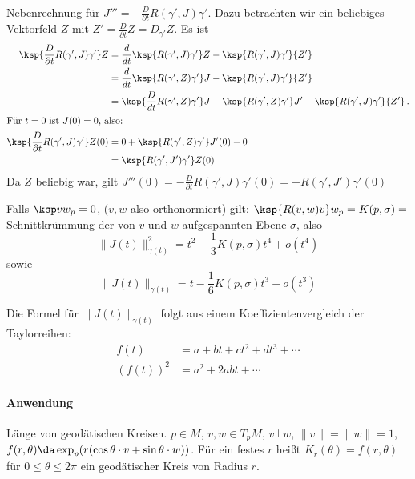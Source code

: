 \documentclass[a4paper,twoside,DIV15,BCOR12mm]{scrbook}
\begin{document}
\begin{beispiel}
\begin{beweis}
\begin{enumerate}
Nebenrechnung für $J'''= -\frac D {\partial t} R(\gamma',J)\gamma'$. Dazu betrachten wir ein beliebiges Vektorfeld $Z$ mit $Z' = \frac D{\partial t}Z = D_{\gamma'}Z$. Es ist 
\begin{align*}
\ksp{\frac D{\partial t} R(\gamma',J) \gamma'}Z &= \frac d{dt} \ksp {R(\gamma',J)\gamma'}Z - \ksp{R(\gamma',J)\gamma'}{Z'}\\
&= \frac d{dt} \ksp {R(\gamma',Z)\gamma'}J - \ksp{R(\gamma',J)\gamma'}{Z'}\\
&= \ksp {\frac D{dt} R(\gamma',Z)\gamma'}J + \ksp {R(\gamma',Z)\gamma'} J' - \ksp{R(\gamma',J)\gamma'}{Z'}\,.\\
\intertext{Für $t=0$ ist $J(0)=0$, also:}
\ksp{\frac D{\partial t} R(\gamma',J) \gamma'}Z(0) &= 0 + \ksp {R(\gamma',Z)\gamma'} J'(0) - 0 \\
&= \ksp{R(\gamma',J')\gamma'}Z(0)
\end{align*}
Da $Z$ beliebig war, gilt $J'''(0) = - \frac D{\partial t} R(\gamma',J) \gamma'(0) = - R(\gamma',J')\gamma'(0)$

\end{enumerate}
\end{beweis}

\begin{korrolar}
Falls $\ksp v w_p =0$, ($v,w$ also orthonormiert) gilt: $\ksp {R(v,w)v}w_p = K(p,\sigma) =$ Schnittkrümmung der von $v$ und $w$ aufgespannten Ebene $\sigma$, also
\[
\|J(t)\|_{\gamma(t)}^2 =t^2 - \frac 1 3 K(p,\sigma)t^4 + o(t^4)
\]
sowie
\[
\|J(t)\|_{\gamma(t)} = t - \frac 1 6 K(p,\sigma)t^3 + o(t^3)
\]

\end{korrolar}

\begin{beweis}
Die Formel für $\|J(t)\|_{\gamma(t)}$ folgt aus einem Koeffizientenvergleich der Taylorreihen:
\begin{align*}
f(t) &= a + bt + ct^2 + dt^3+\cdots \\
(f(t))^2 &= a^2 + 2abt + \cdots
\end{align*}
\end{beweis}

\paragraph{Anwendung} Länge von geodätischen Kreisen. $p\in M$, $v,w\in T_pM$, $v\bot w$, $\|v\|=\|w\|=1$, $f(r,\theta) \da \exp_p(r (\cos \theta \cdot v + \sin \theta \cdot w))$. Für ein festes $r$ heißt $K_r(\theta) = f(r,\theta)$ für $0\le\theta\le2\pi$ ein geodätischer Kreis von Radius $r$.


\end{beispiel}
\end{document}
